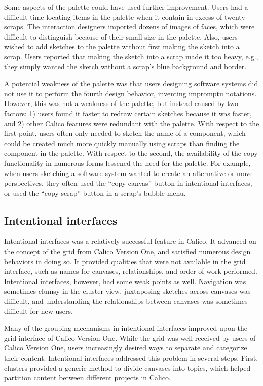 Some aspects of the palette could have used further improvement. Users had a difficult time locating items in the palette when it contain in excess of twenty scraps. The interaction designers imported dozens of images of faces, which were difficult to distinguish because of their small size in the palette. Also, users wished to add sketches to the palette without first making the sketch into a scrap. Users reported that making the sketch into a scrap made it too heavy, e.g., they simply wanted the sketch without a scrap's blue background and border.

A potential weakness of the palette was that users designing software systems did not use it to perform the fourth design behavior, inventing impromptu notations. However, this was not a weakness of the palette, but instead caused by two factors: 1) users found it faster to redraw certain sketches because it was faster, and 2) other Calico features were redundant with the palette. With respect to the first point, users often only needed to sketch the name of a component, which could be created much more quickly manually using scraps than finding the component in the palette. With respect to the second, the availability of the copy functionality in numerous forms lessened the need for the palette. For example, when users sketching a software system wanted to create an alternative or move perspectives, they often used the ``copy canvas'' button in intentional interfaces, or used the ``copy scrap'' button in a scrap's bubble menu.

\subsection{Intentional interfaces}

Intentional interfaces was a relatively successful feature in Calico. It advanced on the concept of the grid from Calico Version One, and satisfied numerous design behaviors in doing so. It provided qualities that were not available in the grid interface, such as names for canvases, relationships, and order of work performed. Intentional interfaces, however, had some weak points as well. Navigation was sometimes clumsy in the cluster view, juxtaposing sketches across canvases was difficult, and understanding the relationships between canvases was sometimes difficult for new users.

Many of the grouping mechanisms in intentional interfaces improved upon the grid interface of Calico Version One. While the grid was well received by users of Calico Version One, users increasingly desired ways to separate and categorize their content. Intentional interfaces addressed this problem in several steps. First, clusters provided a generic method to divide canvases into topics, which helped partition content between different projects in Calico.

